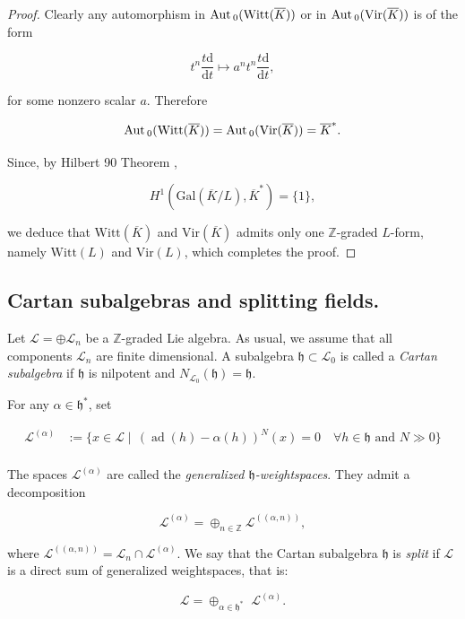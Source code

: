 \documentclass[11pt, letterpaper, reqno]{amsart}
\theoremstyle{definition}
\newcommand{\ad}{\operatorname{ad}}
\newcommand{\Z}{{\mathbb Z}}
\newcommand{\cL}{\mathcal L}
\newcommand{\Aut}{\mbox{\rm Aut\,}}
\newcommand{\fh}{\mathfrak{h}}
\newcommand{\Gal}{{\mathrm {Gal}}}
\newcommand{\Vir}{\mathrm{Vir}}
\newcommand{\Witt}{\mathrm{Witt}}
\renewcommand{\d}{\mathrm{d}}
\begin{document}
\begin{proof} 

Clearly any automorphism
in  $\Aut_0 (\Witt(\overline{K}))$
or in $\Aut_0 (\Vir(\overline{K}))$ is of the form

$$t^n\frac{t\d}{\d t}
\mapsto a^n t^n\frac{t\d}{\d t},$$

\noindent for some nonzero scalar $a$.
Therefore 

$$\Aut_0 (\Witt(\overline{K}))=\Aut_0 (\Vir(\overline{K}))=\overline{K}^*.$$




Since, by Hilbert 90 Theorem \cite{Hilbert90}, 

$$H^1(\Gal(\overline{K}/L), 
\overline{K}^*)=\{1\},$$


\noindent we deduce that 
$\Witt(\overline{K})$ and
$\Vir(\overline{K})$ admits only one $\Z$-graded $L$-form,
namely $\Witt(L)$ and $\Vir(L)$, which completes the proof.
\end{proof}




\subsection{Cartan subalgebras and splitting fields.}
Let $\cL=\oplus \cL_n$ be a $\Z$-graded Lie algebra. As usual, we assume that all
components $\cL_n$ are finite dimensional.
A subalgebra $\fh\subset \cL_0$ is called 
a {\it Cartan subalgebra} if $\fh$ is nilpotent 
and $N_{\cL_0}(\fh)=\fh$. 

For any $\alpha\in \fh^*$, set 

\begin{align*}
\mathcal{L}^{(\alpha)}&:=
\{x\in \mathcal{L}\mid \, (\ad(h)-\alpha(h))^N(x) = 0 \quad
\forall h\in\fh \text{ and } N\gg0\}\\
 \end{align*}
 
The spaces $\mathcal{L}^{(\alpha)}$ are called the {\it generalized $\fh$-weightspaces}. They admit a decomposition 

$$\mathcal{L}^{(\alpha)}=\oplus_{n\in\Z}\mathcal{L}^{((\alpha,n))},$$

\noindent where $\mathcal{L}^{((\alpha,n))}=\cL_n\cap \mathcal{L}^{(\alpha)}$. We say that the Cartan subalgebra $\fh$ is {\it split} if  $\cL$ is a direct sum of generalized weightspaces,
that is:
 
 $$\cL=\oplus_{\alpha\in\fh^*}\,\,\mathcal{L}^{(\alpha)}.$$
 
\end{document}
